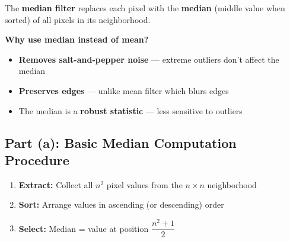 \documentclass[12pt,a4paper]{article}
\begin{document}
\begin{conceptbox}
The \textbf{median filter} replaces each pixel with the \textbf{median} (middle value when sorted) of all pixels in its neighborhood.

\textbf{Why use median instead of mean?}
\begin{itemize}
    \item \textbf{Removes salt-and-pepper noise} --- extreme outliers don't affect the median
    \item \textbf{Preserves edges} --- unlike mean filter which blurs edges
    \item The median is a \textbf{robust statistic} --- less sensitive to outliers
\end{itemize}
\end{conceptbox}

\subsection{Part (a): Basic Median Computation Procedure}

\begin{enumerate}
    \item \textbf{Extract:} Collect all $n^2$ pixel values from the $n\times n$ neighborhood
    \item \textbf{Sort:} Arrange values in ascending (or descending) order
    \item \textbf{Select:} Median = value at position $\dfrac{n^2+1}{2}$
\end{enumerate}
\end{document}
